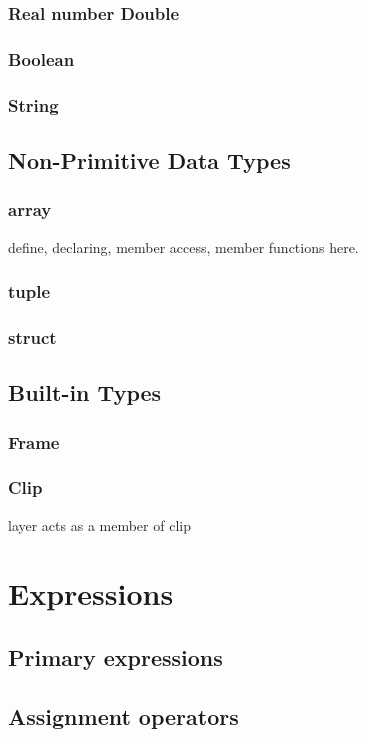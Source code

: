 \documentclass[12pt]{article}
\begin{document}
\subsubsection{Real number Double}
\subsubsection{Boolean}
\subsubsection{String}


\subsection{Non-Primitive Data Types}
\subsubsection{array}
define, declaring, member access, member functions here.
\subsubsection{tuple}
\subsubsection{struct}

\subsection{Built-in Types}
\subsubsection{Frame}
\subsubsection{Clip}
layer acts as a member of clip 

\section{Expressions}
\subsection{Primary expressions}
\subsection{Assignment operators}
\end{document}
